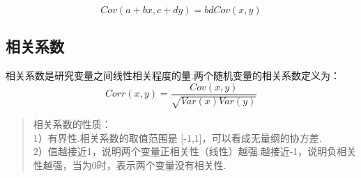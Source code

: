 \[
Cov(a+bx, c+dy) = bdCov(x, y)
\]

\subsection{ 相关系数}\label{ux76f8ux5173ux7cfbux6570}

相关系数是研究变量之间线性相关程度的量.两个随机变量的相关系数定义为：
\[
Corr(x,y) = \frac{Cov(x,y)}{\sqrt{Var(x)Var(y)}}
\]

\begin{quote}
相关系数的性质：\\
1）有界性.相关系数的取值范围是 {[}-1,1{]}，可以看成无量纲的协方差.\\
2）值越接近1，说明两个变量正相关性（线性）越强.越接近-1，说明负相关性越强，当为0时，表示两个变量没有相关性.
\end{quote}





